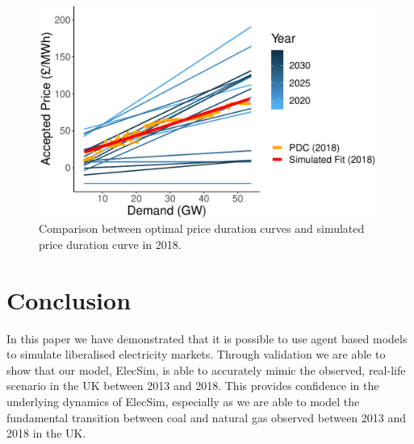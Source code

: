 \begin{figure}
	\centering
	\includegraphics[width=\textwidth, height=\textwidth, keepaspectratio]{Chapter4/figures/e-Energy-2020/results/scenario_analysis/optimal_pdc_prices.pdf}
	\caption{Comparison between optimal price duration curves and simulated price duration curve in 2018.}
	\label{fig:forward_scenario_best_pdcs}
\end{figure}









\section{Conclusion}
\label{sec:conclusion}

In this paper we have demonstrated that it is possible to use agent based models to simulate liberalised electricity markets. Through validation we are able to show that our model, ElecSim, is able to accurately mimic the observed, real-life scenario in the UK between 2013 and 2018. This provides confidence in the underlying dynamics of ElecSim, especially as we are able to model the fundamental transition between coal and natural gas observed between 2013 and 2018 in the UK.

